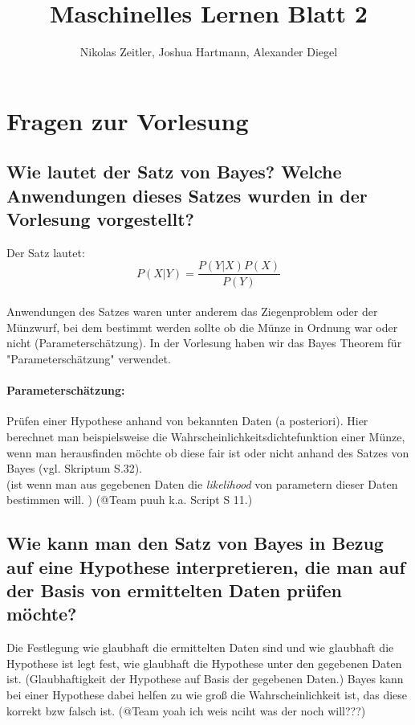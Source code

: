 \documentclass{scrartcl}
\author{Nikolas Zeitler, Joshua Hartmann, Alexander Diegel}
\title{Maschinelles Lernen Blatt 2}
\begin{document}
\maketitle 
\section{Fragen zur Vorlesung}
\subsection{Wie lautet der Satz von Bayes? Welche Anwendungen dieses Satzes wurden in der Vorlesung vorgestellt?}
Der Satz lautet: \[P(X|Y) = \frac{P(Y|X)P(X)}{P(Y)} \] \\
Anwendungen des Satzes waren unter anderem das Ziegenproblem oder der Münzwurf, bei dem bestimmt werden sollte ob die Münze in Ordnung war oder nicht (Parameterschätzung).
In der Vorlesung haben wir das Bayes Theorem für "Parameterschätzung" verwendet. \\
\paragraph{Parameterschätzung:} Prüfen einer Hypothese anhand von bekannten Daten (a posteriori). Hier berechnet man beispielsweise die Wahrscheinlichkeitsdichtefunktion einer Münze, wenn man herausfinden möchte ob diese fair ist oder nicht anhand des Satzes von Bayes (vgl. Skriptum S.32).
\\ (ist wenn man aus gegebenen Daten die \textit{likelihood} von parametern dieser Daten bestimmen will. )
(@Team puuh k.a. Script S 11.)

\subsection{Wie kann man den Satz von Bayes in Bezug auf eine Hypothese interpretieren, die man auf der Basis von ermittelten Daten prüfen möchte?}
Die Festlegung wie glaubhaft die ermittelten Daten sind und wie glaubhaft die Hypothese ist legt fest, wie glaubhaft die Hypothese unter den gegebenen Daten ist. (Glaubhaftigkeit der Hypothese auf Basis der gegebenen Daten.)
Bayes kann bei einer Hypothese dabei helfen zu wie groß die Wahrscheinlichkeit ist, das diese korrekt bzw falsch ist. 
(@Team yoah ich weis nciht was der noch will???)
\end{document}
